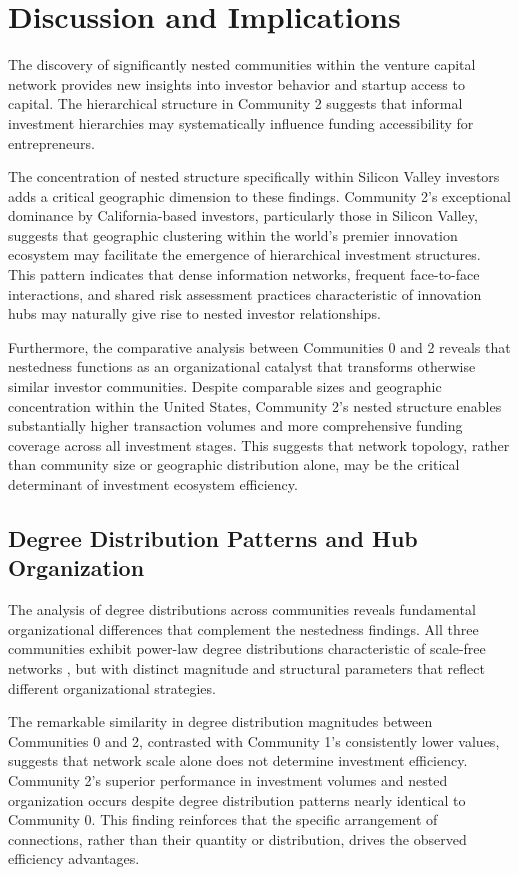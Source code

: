 
\section{Discussion and Implications}

The discovery of significantly nested communities within the venture capital network provides new insights into investor behavior and startup access to capital. The hierarchical structure in Community 2 suggests that informal investment hierarchies may systematically influence funding accessibility for entrepreneurs.

The concentration of nested structure specifically within Silicon Valley investors adds a critical geographic dimension to these findings. Community 2's exceptional dominance by California-based investors, particularly those in Silicon Valley, suggests that geographic clustering within the world's premier innovation ecosystem may facilitate the emergence of hierarchical investment structures. This pattern indicates that dense information networks, frequent face-to-face interactions, and shared risk assessment practices characteristic of innovation hubs may naturally give rise to nested investor relationships.

Furthermore, the comparative analysis between Communities 0 and 2 reveals that nestedness functions as an organizational catalyst that transforms otherwise similar investor communities. Despite comparable sizes and geographic concentration within the United States, Community 2's nested structure enables substantially higher transaction volumes and more comprehensive funding coverage across all investment stages. This suggests that network topology, rather than community size or geographic distribution alone, may be the critical determinant of investment ecosystem efficiency.

\subsection{Degree Distribution Patterns and Hub Organization}

The analysis of degree distributions across communities reveals fundamental organizational differences that complement the nestedness findings. All three communities exhibit power-law degree distributions characteristic of scale-free networks \cite{Borgatti2011}, but with distinct magnitude and structural parameters that reflect different organizational strategies.

The remarkable similarity in degree distribution magnitudes between Communities 0 and 2, contrasted with Community 1's consistently lower values, suggests that network scale alone does not determine investment efficiency. Community 2's superior performance in investment volumes and nested organization occurs despite degree distribution patterns nearly identical to Community 0. This finding reinforces that the specific arrangement of connections, rather than their quantity or distribution, drives the observed efficiency advantages.


